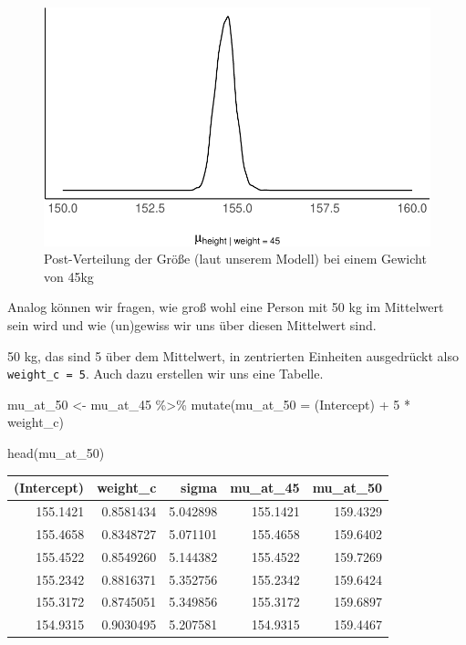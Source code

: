 \documentclass[
  a4paper,
  DIV=11]{scrreprt}
\newenvironment{Shaded}{\begin{snugshade}}{\end{snugshade}}
\newcommand{\AttributeTok}[1]{\textcolor[rgb]{0.40,0.45,0.13}{#1}}
\newcommand{\DecValTok}[1]{\textcolor[rgb]{0.68,0.00,0.00}{#1}}
\newcommand{\FunctionTok}[1]{\textcolor[rgb]{0.28,0.35,0.67}{#1}}
\newcommand{\NormalTok}[1]{\textcolor[rgb]{0.00,0.23,0.31}{#1}}
\newcommand{\OtherTok}[1]{\textcolor[rgb]{0.00,0.23,0.31}{#1}}
\newcommand{\SpecialCharTok}[1]{\textcolor[rgb]{0.37,0.37,0.37}{#1}}
\newcommand{\StringTok}[1]{\textcolor[rgb]{0.13,0.47,0.30}{#1}}
\theoremstyle{definition}
\theoremstyle{remark}
\begin{document}
\begin{figure}

{\centering \includegraphics{./lineare-modelle_files/figure-pdf/fig-mu-at-45-1.pdf}

}

\caption{\label{fig-mu-at-45}Post-Verteilung der Größe (laut unserem
Modell) bei einem Gewicht von 45kg}

\end{figure}

Analog können wir fragen, wie groß wohl eine Person mit 50 kg im
Mittelwert sein wird und wie (un)gewiss wir uns über diesen Mittelwert
sind.

50 kg, das sind 5 über dem Mittelwert, in zentrierten Einheiten
ausgedrückt also \texttt{weight\_c\ =\ 5}. Auch dazu erstellen wir uns
eine Tabelle.

\begin{Shaded}
\begin{Highlighting}[]
\NormalTok{mu\_at\_50 }\OtherTok{\textless{}{-}}
\NormalTok{  mu\_at\_45 }\SpecialCharTok{\%\textgreater{}\%} 
  \FunctionTok{mutate}\NormalTok{(}\AttributeTok{mu\_at\_50 =} \StringTok{\textasciigrave{}}\AttributeTok{(Intercept)}\StringTok{\textasciigrave{}} \SpecialCharTok{+} \DecValTok{5} \SpecialCharTok{*}\NormalTok{ weight\_c)}

\FunctionTok{head}\NormalTok{(mu\_at\_50)}
\end{Highlighting}
\end{Shaded}

\begin{longtable}[]{@{}rrrrr@{}}
\toprule()
(Intercept) & weight\_c & sigma & mu\_at\_45 & mu\_at\_50 \\
\midrule()
\endhead
155.1421 & 0.8581434 & 5.042898 & 155.1421 & 159.4329 \\
155.4658 & 0.8348727 & 5.071101 & 155.4658 & 159.6402 \\
155.4522 & 0.8549260 & 5.144382 & 155.4522 & 159.7269 \\
155.2342 & 0.8816371 & 5.352756 & 155.2342 & 159.6424 \\
155.3172 & 0.8745051 & 5.349856 & 155.3172 & 159.6897 \\
154.9315 & 0.9030495 & 5.207581 & 154.9315 & 159.4467 \\
\bottomrule()
\end{longtable}
\end{document}
